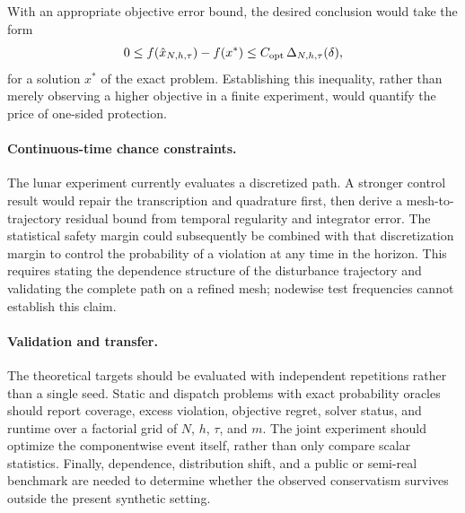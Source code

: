 With an appropriate objective error bound, the desired conclusion would take the
form
\begin{equation}
  0\leq f(\hat x_{N,h,\tau})-f(x^*)
  \leq C_{\rm opt}\,\Delta_{N,h,\tau}(\delta),
  \label{eq:future-objective-gap}
\end{equation}
for a solution $x^*$ of the exact problem. Establishing this inequality, rather
than merely observing a higher objective in a finite experiment, would quantify
the price of one-sided protection.

\paragraph*{Continuous-time chance constraints.}
The lunar experiment currently evaluates a discretized path. A stronger control
result would repair the transcription and quadrature first, then derive a
mesh-to-trajectory residual bound from temporal regularity and integrator error.
The statistical safety margin could subsequently be combined with that
discretization margin to control the probability of a violation at any time in
the horizon. This requires stating the dependence structure of the disturbance
trajectory and validating the complete path on a refined mesh; nodewise test
frequencies cannot establish this claim.

\paragraph*{Validation and transfer.}
The theoretical targets should be evaluated with independent repetitions rather
than a single seed. Static and dispatch problems with exact probability oracles
should report coverage, excess violation, objective regret, solver status, and
runtime over a factorial grid of $N$, $h$, $\tau$, and $m$. The joint experiment
should optimize the componentwise event itself, rather than only compare scalar
statistics. Finally, dependence, distribution shift, and a public or
semi-real benchmark are needed to determine whether the observed conservatism
survives outside the present synthetic setting.
